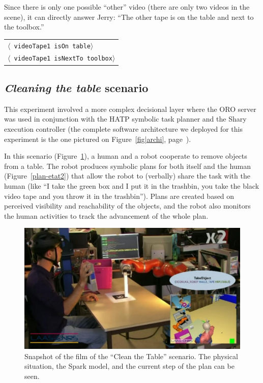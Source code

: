 \documentclass[preprint,3p,times]{elsarticle}
\newcommand{\stmt}[1]{{\footnotesize \tt $\langle$ #1\relax$\rangle$}}
\begin{document}
Since there is only one possible ``other'' video (there are only two videos in
the scene), it can directly answer Jerry: ``The other tape is on the table and
next to the toolbox.''

\begin{center}
\begin{tabular}{l}
\stmt{videoTape1 isOn table}\\
\stmt{videoTape1 isNextTo toolbox}
\end{tabular}
\end{center}


\subsection{\emph{Cleaning the table} scenario}

This experiment involved a more complex decisional layer where the ORO server
was used in conjunction with the HATP symbolic task planner and the {\sc Shary}
execution controller (the complete software architecture we deployed for this
experiment is the one pictured on Figure~\ref{fig|archi},
page~\pageref{fig|archi}).

In this scenario (Figure~\ref{fig|cleantable-video}), a human and a robot
cooperate to remove objects from a table. The robot produces symbolic plans for
both itself and the human (Figure~\ref{plan-etat2})
that allow the robot to (verbally) share the task with the human (like ``I take
the green box and I put it in the trashbin, you take the black video tape and
you throw it in the trashbin''). Plans are created based on perceived
visibility and reachability of the objects, and the robot also monitors the
human activities to track the advancement of the whole plan.

\begin{figure}
    \centering
    \includegraphics[width=0.7\columnwidth]{cleantable.jpg}

    \caption{Snapshot of the film of the ``Clean the Table'' scenario. The
    physical situation, the {\sc Spark} model, and the current step of the plan can
    be seen.}

    \label{fig|cleantable-video}
\end{figure}
\end{document}
